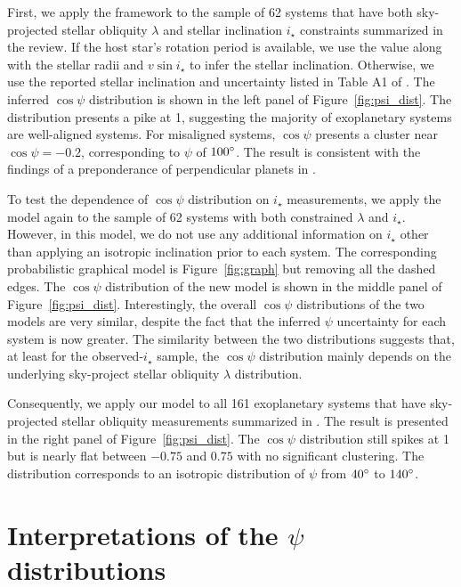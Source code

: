 \documentclass[twocolumn,times]{aastex631}
\newcommand{\numistar}{62\xspace}
\newcommand{\numall}{161\xspace}
\begin{document}
First, we apply the framework to the sample of \numistar systems that have both sky-projected stellar obliquity $\lambda$ and stellar inclination $i_\star$ constraints summarized in the \cite{Albrecht22} review. If the host star's rotation period is available, we use the value along with the stellar radii and $v\sin{i_\star}$ to infer the stellar inclination. Otherwise, we use the reported stellar inclination and uncertainty listed in Table A1 of \cite{Albrecht22}.
The inferred $\cos{\psi}$ distribution is shown in the left panel of Figure~\ref{fig:psi_dist}. The distribution presents a pike at 1, suggesting the majority of exoplanetary systems are well-aligned systems. For misaligned systems, $\cos{\psi}$ presents a cluster near $\cos{\psi} = -0.2$, corresponding to $\psi$ of $100\mbox{$^\circ$}$. The result is consistent with the findings of a preponderance of perpendicular planets in \cite{Albrecht21}.

To test the dependence of $\cos{\psi}$ distribution on $i_\star$ measurements, we apply the model again to the sample of \numistar systems with both constrained $\lambda$ and $i_\star$. However, in this model, we do not use any additional information on $i_\star$ other than applying an isotropic inclination prior to each system. The corresponding probabilistic graphical model is Figure~\ref{fig:graph} but removing all the dashed edges.
The $\cos{\psi}$ distribution of the new model is shown in the middle panel of Figure~\ref{fig:psi_dist}. Interestingly, the overall $\cos{\psi}$ distributions of the two models are very similar, despite the fact that the inferred $\psi$ uncertainty for each system is now greater.
The similarity between the two distributions suggests that, at least for the observed-$i_\star$ sample, the $\cos{\psi}$ distribution mainly depends on the underlying sky-project stellar obliquity $\lambda$ distribution.

Consequently, we apply our model to all \numall exoplanetary systems that have sky-projected stellar obliquity measurements summarized in \cite{Albrecht22}. The result is presented in the right panel of Figure~\ref{fig:psi_dist}. The $\cos{\psi}$ distribution still spikes at 1 but is nearly flat between $-0.75$ and $0.75$ with no significant clustering. The distribution corresponds to an isotropic distribution of $\psi$ from $40\mbox{$^\circ$}$ to $140\mbox{$^\circ$}$.

\section{Interpretations of the \texorpdfstring{$\psi$}{psi} distributions}\label{sec:interpretations}
\end{document}
